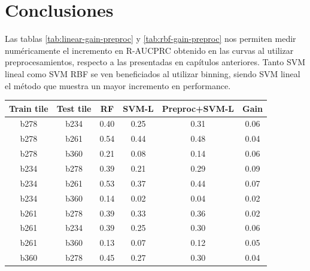 \section{Conclusiones}
\label{baseline_preproc}
Las tablas \ref{tab:linear-gain-preproc} y \ref{tab:rbf-gain-preproc} nos permiten medir numéricamente el incremento en R-AUCPRC obtenido en las curvas al utilizar preprocesamientos, respecto a las presentadas en capítulos anteriores. Tanto SVM lineal como SVM RBF se ven beneficiados al utilizar binning, siendo SVM lineal el método que muestra un mayor incremento en performance.



\begin{table}[h!]
\centering
\begin{tabular}{|c|c|c|c|c|c|}
\hline
\textbf{Train tile} & \textbf{Test tile} & \textbf{RF} & \textbf{SVM-L} & \textbf{Preproc+SVM-L} & \textbf{Gain}              \\ \hline
b278                & b234               & 0.40        & 0.25           & 0.31                   & 0.06                       \\ \hline
b278                & b261               & 0.54        & 0.44           & 0.48                   & 0.04                       \\ \hline
b278                & b360               & 0.21        & 0.08           & 0.14                   & 0.06                       \\ \hline
b234                & b278               & 0.39        & 0.21           & 0.29                   & 0.09                       \\ \hline
b234                & b261               & 0.53        & 0.37           & 0.44                   & 0.07                       \\ \hline
b234                & b360               & 0.14        & 0.02           & 0.04                   & 0.02                       \\ \hline
b261                & b278               & 0.39        & 0.33           & 0.36                   & 0.02                       \\ \hline
b261                & b234               & 0.39        & 0.25           & 0.30                   & 0.06                       \\ \hline
b261                & b360               & 0.13        & 0.07           & 0.12                   & 0.05                       \\ \hline
b360                & b278               & 0.45        & 0.27           & 0.30                   & 0.04                       \\ \hline

\end{tabular}
\end{table}
